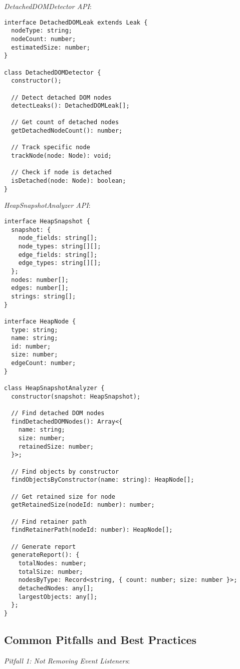 \documentclass[11pt]{article}
\begin{document}
\emph{DetachedDOMDetector API}:

\begin{verbatim}
interface DetachedDOMLeak extends Leak {
  nodeType: string;
  nodeCount: number;
  estimatedSize: number;
}

class DetachedDOMDetector {
  constructor();
  
  // Detect detached DOM nodes
  detectLeaks(): DetachedDOMLeak[];
  
  // Get count of detached nodes
  getDetachedNodeCount(): number;
  
  // Track specific node
  trackNode(node: Node): void;
  
  // Check if node is detached
  isDetached(node: Node): boolean;
}
\end{verbatim}

\emph{HeapSnapshotAnalyzer API}:

\begin{verbatim}
interface HeapSnapshot {
  snapshot: {
    node_fields: string[];
    node_types: string[][];
    edge_fields: string[];
    edge_types: string[][];
  };
  nodes: number[];
  edges: number[];
  strings: string[];
}

interface HeapNode {
  type: string;
  name: string;
  id: number;
  size: number;
  edgeCount: number;
}

class HeapSnapshotAnalyzer {
  constructor(snapshot: HeapSnapshot);
  
  // Find detached DOM nodes
  findDetachedDOMNodes(): Array<{
    name: string;
    size: number;
    retainedSize: number;
  }>;
  
  // Find objects by constructor
  findObjectsByConstructor(name: string): HeapNode[];
  
  // Get retained size for node
  getRetainedSize(nodeId: number): number;
  
  // Find retainer path
  findRetainerPath(nodeId: number): HeapNode[];
  
  // Generate report
  generateReport(): {
    totalNodes: number;
    totalSize: number;
    nodesByType: Record<string, { count: number; size: number }>;
    detachedNodes: any[];
    largestObjects: any[];
  };
}
\end{verbatim}
\subsection{Common Pitfalls and Best Practices}
\label{sec:orgc96a24a}

\emph{Pitfall 1: Not Removing Event Listeners}:
\end{document}
